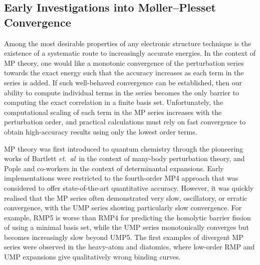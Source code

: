 \documentclass[aps,prb,reprint,noshowkeys,linenumbers,superscriptaddress]{revtex4-1}
\newcommand{\hugh}[1]{\textcolor{hughgreen}{#1}}
\newcommand{\etal}{\textit{et.\ al}}
\begin{document}
\subsection{Early Investigations into M{\o}ller--Plesset Convergence} %

\hugh{%
 Among the most desirable properties of any electronic structure technique is the existence of 
a systematic route to increasingly accurate energies. 
In the context of MP theory, one would like a monotonic convergence of the perturbation
series towards the exact energy such that the accuracy increases as each term in the series is added.
If such well-behaved convergence can be established, then our ability to compute individual 
terms in the series becomes the only barrier to computing the exact correlation in a finite basis set.
Unfortunately, the computational scaling of each term in the MP series increases with the perturbation
order, and practical calculations must rely on fast convergence
to obtain high-accuracy results using only the lowest order terms.
}

\hugh{%
MP theory was first introduced to quantum chemistry through the pioneering
works of Bartlett \etal\ in the context of many-body perturbation theory,\cite{Bartlett_1975}
and Pople and co-workers in the context of determinantal expansions.\cite{Pople_1976,Pople_1978}
Early implementations were restricted to the fourth-order MP4 approach that was considered
to offer state-of-the-art quantitative accuracy.\cite{Pople_1978,Krishnan_1980}
However, it was quickly realised that the MP series often demonstrated very slow, oscillatory, 
or erratic convergence, with the UMP series showing particularly slow convergence.\cite{Laidig_1985,Knowles_1985,Handy_1985}
For example, RMP5 is worse than RMP4 for predicting the homolytic barrier fission of \ce{He2^2+} using a minimal basis set, 
while the UMP series monotonically converges but becomes increasingly slow beyond UMP5.\cite{Gill_1986}
The first examples of divergent MP series were observed in the heavy-atom \ce{N2} and \ce{F2} 
diatomics, where low-order RMP and UMP expansions give qualitatively wrong binding curves.\cite{Laidig_1987} 
}
\end{document}
